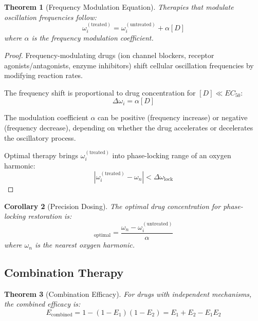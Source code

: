 \documentclass[11pt,twocolumn,a4paper]{article}
\newtheorem{theorem}{Theorem}[section]
\newtheorem{corollary}[theorem]{Corollary}
\theoremstyle{definition}
\theoremstyle{remark}
\newcommand{\omegalock}{\Delta\omega_{\mathrm{lock}}}
\begin{document}
\begin{theorem}[Frequency Modulation Equation]
\label{thm:frequency_modulation}
Therapies that modulate oscillation frequencies follow:
\begin{equation}
\omega_i^{\mathrm{(treated)}} = \omega_i^{\mathrm{(untreated)}} + \alpha [D]
\label{eq:frequency_modulation}
\end{equation}
where $\alpha$ is the frequency modulation coefficient.
\end{theorem}

\begin{proof}
Frequency-modulating drugs (ion channel blockers, receptor agonists/antagonists, enzyme inhibitors) shift cellular oscillation frequencies by modifying reaction rates.

The frequency shift is proportional to drug concentration for $[D] \ll EC_{50}$:
\begin{equation}
\Delta\omega_i = \alpha [D]
\end{equation}

The modulation coefficient $\alpha$ can be positive (frequency increase) or negative (frequency decrease), depending on whether the drug accelerates or decelerates the oscillatory process.

Optimal therapy brings $\omega_i^{\mathrm{(treated)}}$ into phase-locking range of an oxygen harmonic:
\begin{equation}
|\omega_i^{\mathrm{(treated)}} - \omega_n| < \omegalock
\label{eq:optimal_frequency}
\end{equation}
\end{proof}

\begin{corollary}[Precision Dosing]
\label{cor:precision_dosing}
The optimal drug concentration for phase-locking restoration is:
\begin{equation}
[D]_{\mathrm{optimal}} = \frac{\omega_n - \omega_i^{\mathrm{(untreated)}}}{\alpha}
\label{eq:optimal_dose}
\end{equation}
where $\omega_n$ is the nearest oxygen harmonic.
\end{corollary}

\subsection{Combination Therapy}

\begin{theorem}[Combination Efficacy]
\label{thm:combination_efficacy}
For drugs with independent mechanisms, the combined efficacy is:
\begin{equation}
E_{\mathrm{combined}} = 1 - (1 - E_1)(1 - E_2) = E_1 + E_2 - E_1 E_2
\label{eq:combination_efficacy}
\end{equation}
\end{theorem}
\end{document}
